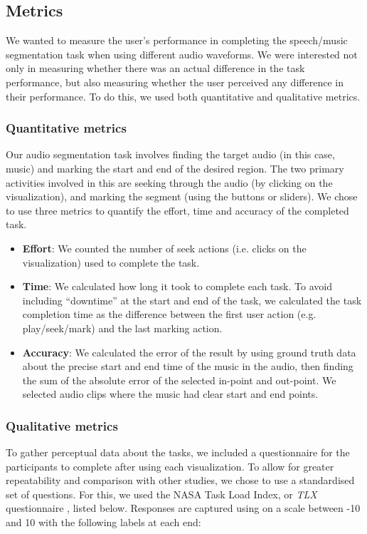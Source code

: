 \subsection{Metrics}

We wanted to measure the user's performance in completing the speech/music segmentation task when using different audio
waveforms. We were interested not only in measuring whether there was an actual difference in the task performance, but
also measuring whether the user perceived any difference in their performance.  To do this, we used both quantitative
and qualitative metrics.

\subsubsection{Quantitative metrics}
Our audio segmentation task involves finding the target audio (in this case, music) and marking the start and end of
the desired region. The two primary activities involved in this are seeking through the audio (by clicking on the
visualization), and marking the segment (using the buttons or sliders).  We chose to use three metrics to quantify the
effort, time and accuracy of the completed task.

\begin{itemize}
  \item \textbf{Effort}: We counted the number of seek actions (i.e. clicks on the visualization) used to complete the
    task.
  \item \textbf{Time}: We calculated how long it took to complete each task. To avoid including ``downtime'' at the
    start and end of the task, we calculated the task completion time as the difference between the first user action
    (e.g.  play/seek/mark) and the last marking action.
  \item \textbf{Accuracy}: We calculated the error of the result by using ground truth data about the precise start and
    end time of the music in the audio, then finding the sum of the absolute error of the selected in-point and
    out-point. We selected audio clips where the music had clear start and end points.
\end{itemize}

\subsubsection{Qualitative metrics}

To gather perceptual data about the tasks, we included a questionnaire for the participants to complete after using
each visualization. To allow for greater repeatability and comparison with other studies, we chose to use a
standardised set of questions. For this, we used the NASA Task Load Index, or \textit{TLX} questionnaire
\citep{Hart1988}, listed below.  Responses are captured using on a scale between -10 and 10 with the following labels
at each end:

